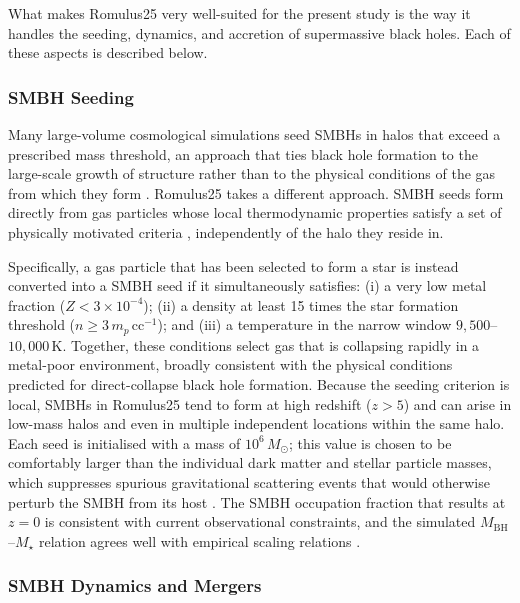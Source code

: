 \documentclass[twocolumn, 10pt]{article}
\begin{document}
What makes Romulus25 very well-suited for the present study is the way it handles the seeding, dynamics, and accretion of supermassive black holes. Each of these aspects is described below.

\subsubsection{SMBH Seeding}
\label{subsubsec:seeding}

Many large-volume cosmological simulations seed SMBHs in halos that exceed a prescribed mass threshold, an approach that ties black hole formation to the large-scale growth of structure rather than to the physical conditions of the gas from which they form \citep[e.g.][]{Schaye2015, Weinberger2017, Pillepich2018, Dave2019}. Romulus25 takes a different approach. SMBH seeds form directly from gas particles whose local thermodynamic properties satisfy a set of physically motivated criteria \citep{Tremmel2017}, independently of the halo they reside in.

Specifically, a gas particle that has been selected to form a star is instead converted into a SMBH seed if it simultaneously satisfies: (i) a very low metal fraction ($Z < 3 \times 10^{-4}$); (ii) a density at least 15 times the star formation threshold ($n \geq 3\,m_p\,\mathrm{cc}^{-1}$); and (iii) a temperature in the narrow window $9{,}500$--$10{,}000\,\mathrm{K}$. Together, these conditions select gas that is collapsing rapidly in a metal-poor environment, broadly consistent with the physical conditions predicted for direct-collapse black hole formation. Because the seeding criterion is local, SMBHs in Romulus25 tend to form at high redshift ($z > 5$) and can arise in low-mass halos and even in multiple independent locations within the same halo. Each seed is initialised with a mass of $10^6\,M_\odot$; this value is chosen to be comfortably larger than the individual dark matter and stellar particle masses, which suppresses spurious gravitational scattering events that would otherwise perturb the SMBH from its host \citep{Tremmel2015}. The SMBH occupation fraction that results at $z = 0$ is consistent with current observational constraints, and the simulated $M_\mathrm{BH}$--$M_\star$ relation agrees well with empirical scaling relations \citep{Tremmel2017}.

\subsubsection{SMBH Dynamics and Mergers}
\label{subsubsec:dynamics}
\end{document}
